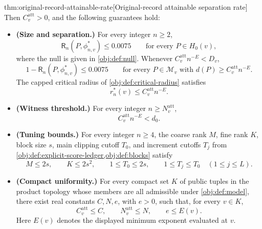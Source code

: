 \begin{theoremv}{thm:original-record-attainable-rate}[Original-record attainable separation rate]
Then \(C^{\mathrm{att}}_v>0\), and the following guarantees hold:
\begin{itemize}
\item \textbf{(Size and separation.)}
For every integer \(n\ge2\),
\[
\mathsf R_n(P,\phi^*_{n,v})\le0.0075
\qquad\text{for every }P\in H_0(v),
\]
where the null is given in \cref{obj:def:null}. Whenever
\(C^{\mathrm{att}}_v n^{-E}<D_v\),
\[
1-\mathsf R_n(P,\phi^*_{n,v})\le0.0075
\qquad
\text{for every }P\in\mathcal M_v
\text{ with }d(P)\ge C^{\mathrm{att}}_v n^{-E}.
\]
The capped critical radius of \cref{obj:def:critical-radius} satisfies
\[
r_n^*(v)\le C^{\mathrm{att}}_v n^{-E}.
\]

\item \textbf{(Witness threshold.)}
For every integer \(n\ge N^{\mathrm{att}}_v\),
\[
C^{\mathrm{att}}_v n^{-E}<d_0.
\]

\item \textbf{(Tuning bounds.)}
For every integer \(n\ge4\), the coarse rank \(M\), fine rank \(K\), block size \(s\), main clipping cutoff \(T_0\), and increment cutoffs \(T_j\) from \cref{obj:def:explicit-score-ledger,obj:def:blocks} satisfy
\[
M\le2s,\qquad K\le2s^2,\qquad
1\le T_0\le2s,\qquad
1\le T_j\le T_0\quad(1\le j\le L).
\]

\item \textbf{(Compact uniformity.)}
For every compact set \(K\) of public tuples in the product topology whose members are all admissible under \cref{obj:def:model}, there exist real constants \(C,N,e\), with \(e>0\), such that, for every \(v\in K\),
\[
C^{\mathrm{att}}_v\le C,\qquad
N^{\mathrm{att}}_v\le N,\qquad e\le E(v).
\]
Here \(E(v)\) denotes the displayed minimum exponent evaluated at \(v\).
\end{itemize}


\end{theoremv}

